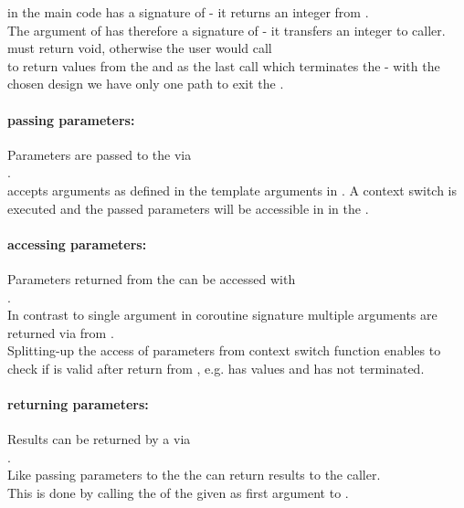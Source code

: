 \coro in the main code has a signature of  - it returns an
integer from \corofunction.\\
The \coro argument of \corofunction {} has therefore a signature of
 - it transfers an integer to caller.\\
\newline
\corofunction must return void, otherwise the user would call\\
\coroop to return values from the \corofunction and  as the
last call which terminates the \corofunction - with the chosen design we have
only one path to exit the \corofunction.

\paragraph*{passing parameters:}
Parameters are passed to the \corofunction via\\\coroop.\\
\newline
\coroop accepts arguments as defined in the template arguments in \coro. A
context switch is executed and the passed parameters will be accessible in in
the \corofunction.

\paragraph*{accessing parameters:}
Parameters returned from the \corofunction can be accessed with\\\coroget.\\
\newline
In contrast to single argument in coroutine signature multiple arguments are
returned via \tuple from \coroget.\\
Splitting-up the access of parameters from context switch function enables to
check if \coro is valid after return from \coroop, e.g. \coro has values and
\corofunction has not terminated.

\paragraph*{returning parameters:}
Results can be returned by a \corofunction via\\\coroop.\\
\newline
Like passing parameters to the \corofunction the \corofunction can return
results to the caller.\\ This is done by calling the \coroop of the \coro given
as first argument to \corofunction.

